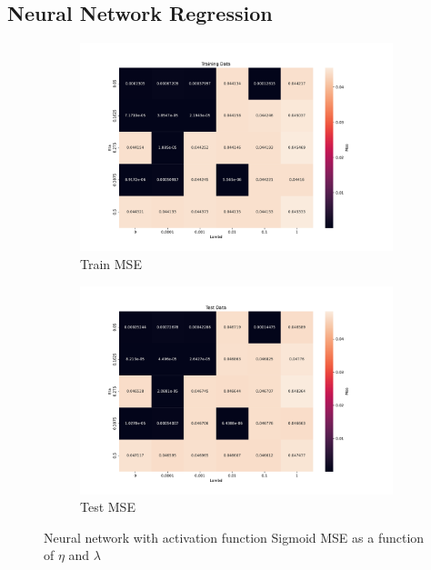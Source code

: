 \subsection{Neural Network Regression}

\begin{figure}[htpb]
\begin{subfigure}{.5\textwidth}
  \centering
  \includegraphics[width=1.2\linewidth]{Figures/PartB/train_sigmoid_MSE(eta,lmb)}
  \caption{Train MSE}
  \label{fig:train_sigmoid_MSE-eta-lmb-}
\end{subfigure}%
\begin{subfigure}{.5\textwidth}
  \centering
  \includegraphics[width=1.2\linewidth]{Figures/PartB/test_sigmoid_MSE(eta,lmb)}
  \caption{Test MSE}
  \label{fig:test_sigmoid_MSE-eta-lmb-}
\end{subfigure}
\caption{Neural network with activation function Sigmoid MSE as a function of \(\eta \) and \(\lambda \) }
\label{fig:Sigmoid_MSE}
\end{figure}

